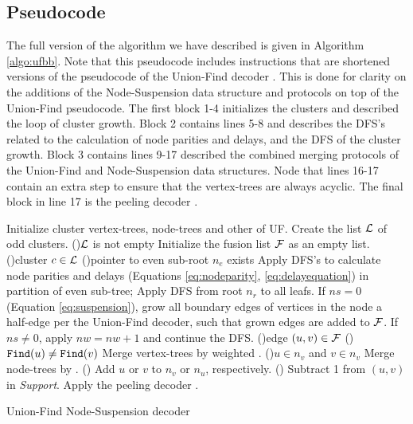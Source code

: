\subsection{Pseudocode}\label{sec:pseudocode}
\FloatBarrier
The full version of the algorithm we have described is given in Algorithm \ref{algo:ufbb}. Note that this pseudocode includes instructions that are shortened versions of the pseudocode of the Union-Find decoder \cite{delfosse2017almost}. This is done for clarity on the additions of the Node-Suspension data structure and protocols on top of the Union-Find pseudocode. The first block 1-4 initializes the clusters and described the loop of cluster growth. Block 2 contains lines 5-8 and describes the DFS's related to the calculation of node parities and delays, and the DFS of the cluster growth. Block 3 contains lines 9-17 described the combined merging protocols of the Union-Find and Node-Suspension data structures. Node that lines 16-17 contain an extra step to ensure that the vertex-trees are always acyclic. The final block in line 17 is the peeling decoder \cite{delfosse2017linear}. 

\begin{algorithm}[htb]
    \BlankLine
    \BlankLine
    Initialize cluster vertex-trees, node-trees and other of UF.\;
    Create the list $\mathcal{L}$ of odd clusters.\;
    \While(){$\mathcal{L}$ is not empty}{
      Initialize the fusion list $\mathcal{F}$ as an empty list.\;
      \For(){cluster $c\in\mathcal{L}$}{
        \If(){pointer to even sub-root $n_e$ exists}{
          Apply DFS's to calculate node parities and delays (Equations \eqref{eq:nodeparity}, \eqref{eq:delayequation}) in partition of even sub-tree;
        }
        Apply DFS from root $n_r$ to all leafs. If $ns=0$ (Equation \eqref{eq:suspension}), grow all boundary edges of vertices in the node a half-edge per the Union-Find decoder, such that grown edges are added to $\mathcal{F}$. If $ns\neq0$, apply $nw=nw+1$ and continue the DFS.\;
      }
      \For(){edge $(u,v) \in \mathcal{F}$}{
        \eIf(){$\texttt{Find}(u)\neq\texttt{Find}(v)$}{
          Merge vertex-trees by weighted .\;
          \eIf(){$u \in n_v$ and $v \in n_v$}{
            Merge node-trees by .\;
          }(){
            Add $u$ or $v$ to $n_v$ or $n_u$, respectively.\;
          }
        }(){
          Subtract 1 from $(u,v)$ in \emph{Support}.\;
        }
      }
    }
    Apply the peeling decoder \cite{delfosse2017linear}.
    \caption{Union-Find Node-Suspension decoder}\label{algo:ufbb}
  \end{algorithm}
    